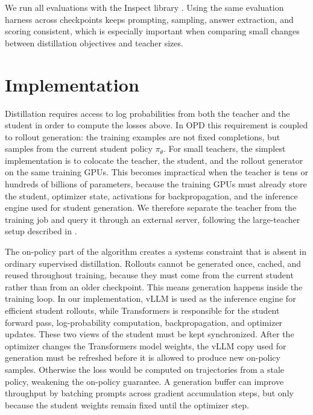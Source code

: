 We run all evaluations with the Inspect library \cite{UK_AI_Security_Institute_Inspect_AI_Framework_2024}. Using the same evaluation harness across checkpoints keeps prompting, sampling, answer extraction, and scoring consistent, which is especially important when comparing small changes between distillation objectives and teacher sizes.

\section{Implementation} \label{sec: implementation}

Distillation requires access to log probabilities from both the teacher and the student in order to compute the losses above. In OPD this requirement is coupled to rollout generation: the training examples are not fixed completions, but samples from the current student policy $\pi_\theta$. For small teachers, the simplest implementation is to colocate the teacher, the student, and the rollout generator on the same training GPUs. This becomes impractical when the teacher is tens or hundreds of billions of parameters, because the training GPUs must already store the student, optimizer state, activations for backpropagation, and the inference engine used for student generation. We therefore separate the teacher from the training job and query it through an external server, following the large-teacher setup described in \cite{patino2026_distilling_100b_models_40x_faster_with_trl}.

The on-policy part of the algorithm creates a systems constraint that is absent in ordinary supervised distillation. Rollouts cannot be generated once, cached, and reused throughout training, because they must come from the current student rather than from an older checkpoint. This means generation happens inside the training loop. In our implementation, vLLM is used as the inference engine for efficient student rollouts, while Transformers \cite{wolf-etal-2020-transformers} is responsible for the student forward pass, log-probability computation, backpropagation, and optimizer updates. These two views of the student must be kept synchronized. After the optimizer changes the Transformers model weights, the vLLM copy used for generation must be refreshed before it is allowed to produce new on-policy samples. Otherwise the loss would be computed on trajectories from a stale policy, weakening the on-policy guarantee. A generation buffer can improve throughput by batching prompts across gradient accumulation steps, but only because the student weights remain fixed until the optimizer step.

